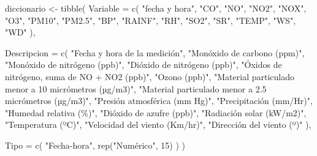 \documentclass[
  letterpaper,
  DIV=11,
  numbers=noendperiod]{scrartcl}
\newenvironment{Shaded}{\begin{snugshade}}{\end{snugshade}}
\newcommand{\AttributeTok}[1]{\textcolor[rgb]{0.40,0.45,0.13}{#1}}
\newcommand{\DecValTok}[1]{\textcolor[rgb]{0.68,0.00,0.00}{#1}}
\newcommand{\FunctionTok}[1]{\textcolor[rgb]{0.28,0.35,0.67}{#1}}
\newcommand{\NormalTok}[1]{\textcolor[rgb]{0.00,0.23,0.31}{#1}}
\newcommand{\OtherTok}[1]{\textcolor[rgb]{0.00,0.23,0.31}{#1}}
\newcommand{\StringTok}[1]{\textcolor[rgb]{0.13,0.47,0.30}{#1}}
\begin{document}
\begin{Shaded}
\begin{Highlighting}[]
\NormalTok{diccionario }\OtherTok{\textless{}{-}} \FunctionTok{tibble}\NormalTok{(}
  \AttributeTok{Variable =} \FunctionTok{c}\NormalTok{(}
    \StringTok{"fecha y hora"}\NormalTok{, }\StringTok{"CO"}\NormalTok{, }\StringTok{"NO"}\NormalTok{, }\StringTok{"NO2"}\NormalTok{, }\StringTok{"NOX"}\NormalTok{, }\StringTok{"O3"}\NormalTok{,}
    \StringTok{"PM10"}\NormalTok{, }\StringTok{"PM2.5"}\NormalTok{, }\StringTok{"BP"}\NormalTok{, }\StringTok{"RAINF"}\NormalTok{, }\StringTok{"RH"}\NormalTok{, }\StringTok{"SO2"}\NormalTok{,}
    \StringTok{"SR"}\NormalTok{, }\StringTok{"TEMP"}\NormalTok{, }\StringTok{"WS"}\NormalTok{, }\StringTok{"WD"}
\NormalTok{  ),}

  \AttributeTok{Descripcion =} \FunctionTok{c}\NormalTok{(}
    \StringTok{"Fecha y hora de la medición"}\NormalTok{,}
    \StringTok{"Monóxido de carbono (ppm)"}\NormalTok{,}
    \StringTok{"Monóxido de nitrógeno (ppb)"}\NormalTok{,}
    \StringTok{"Dióxido de nitrógeno (ppb)"}\NormalTok{,}
    \StringTok{"Óxidos de nitrógeno, suma de NO + NO2 (ppb)"}\NormalTok{,}
    \StringTok{"Ozono (ppb)"}\NormalTok{,}
    \StringTok{"Material particulado menor a 10 micrómetros (µg/m3)"}\NormalTok{,}
    \StringTok{"Material particulado menor a 2.5 micrómetros (µg/m3)"}\NormalTok{,}
    \StringTok{"Presión atmosférica (mm Hg)"}\NormalTok{,}
    \StringTok{"Precipitación (mm/Hr)"}\NormalTok{,}
    \StringTok{"Humedad relativa (\%)"}\NormalTok{,}
    \StringTok{"Dióxido de azufre (ppb)"}\NormalTok{,}
    \StringTok{"Radiación solar (kW/m2)"}\NormalTok{,}
    \StringTok{"Temperatura (ºC)"}\NormalTok{,}
    \StringTok{"Velocidad del viento (Km/hr)"}\NormalTok{,}
    \StringTok{"Dirección del viento (º)"}
\NormalTok{  ),}

  \AttributeTok{Tipo =} \FunctionTok{c}\NormalTok{(}
    \StringTok{"Fecha{-}hora"}\NormalTok{,}
    \FunctionTok{rep}\NormalTok{(}\StringTok{"Numérico"}\NormalTok{, }\DecValTok{15}\NormalTok{)}
\NormalTok{  )}
\NormalTok{)}



\end{Highlighting}
\end{Shaded}
\end{document}

